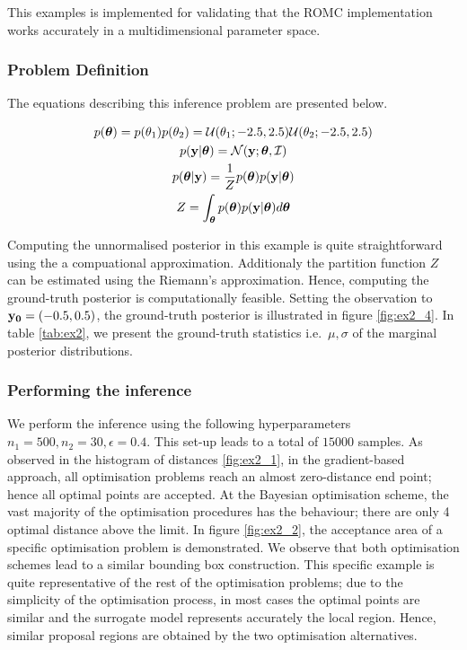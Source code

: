 This examples is implemented for validating that the ROMC
implementation works accurately in a multidimensional parameter
space.

\subsubsection*{Problem Definition}

The equations describing this inference problem are presented below.

\begin{gather}
  p(\boldsymbol{\theta}) = p(\theta_1)p(\theta_2)
  = \mathcal{U}(\theta_1; -2.5, 2.5) \mathcal{U}(\theta_2; -2.5, 2.5)\\
  p(\mathbf{y}|\boldsymbol{\theta}) = \mathcal{N}(\mathbf{y};\boldsymbol{\theta}, \mathcal{I})\\
  p(\boldsymbol{\theta}|\mathbf{y}) = \frac{1}{Z}p(\boldsymbol{\theta})p(\mathbf{y}|\boldsymbol{\theta})\\
  Z = \int_{\boldsymbol{\theta}} p(\boldsymbol{\theta})p(\mathbf{y}|\boldsymbol{\theta}) d\boldsymbol{\theta}
\end{gather}

\noindent
Computing the unnormalised posterior in this example is quite
straightforward using the a compuational approximation. Additionaly
the partition function $Z$ can be estimated using the Riemann's
approximation. Hence, computing the ground-truth posterior is
computationally feasible. Setting the observation to
$\mathbf{y_0}=(-0.5,0.5)$, the ground-truth posterior is illustrated in
figure \ref{fig:ex2_4}. In table \ref{tab:ex2}, we present the
ground-truth statistics i.e.\ $\mu, \sigma$ of the marginal posterior
distributions.

\subsubsection*{Performing the inference}

We perform the inference using the following hyperparameters
$n_1=500, n_2=30, \epsilon=0.4$. This set-up leads to a total of
$15000$ samples. As observed in the histogram of distances
\ref{fig:ex2_1}, in the gradient-based approach, all optimisation
problems reach an almost zero-distance end point; hence all optimal
points are accepted. At the Bayesian optimisation scheme, the vast
majority of the optimisation procedures has the behaviour; there are
only 4 optimal distance above the limit. In figure \ref{fig:ex2_2},
the acceptance area of a specific optimisation problem is
demonstrated. We observe that both optimisation schemes lead to a
similar bounding box construction. This specific example is quite
representative of the rest of the optimisation problems; due to the
simplicity of the optimisation process, in most cases the optimal
points are similar and the surrogate model represents accurately the
local region. Hence, similar proposal regions are obtained by the two
optimisation alternatives.

